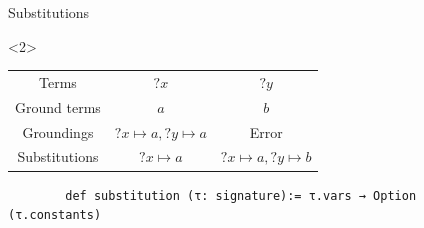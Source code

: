 \documentclass{beamer}
\begin{document}
    \begin{frame}[fragile]{Substitutions}

      \begin{onlyenv}<2>
      \begin{tabular}{c|cc}
        Terms & $?x$ & $?y$ \\ 
        Ground terms & $a$ & $b$ \\
        \hline
        Groundings & $?x \mapsto a, ?y \mapsto a$ & Error \\
        Substitutions & $?x \mapsto a$ & $?x \mapsto a, ?y \mapsto b$
      \end{tabular}

      \begin{lstlisting}
        def substitution (τ: signature):= τ.vars → Option (τ.constants)
      \end{lstlisting}
      \end{onlyenv}
    \end{frame}
\end{document}
